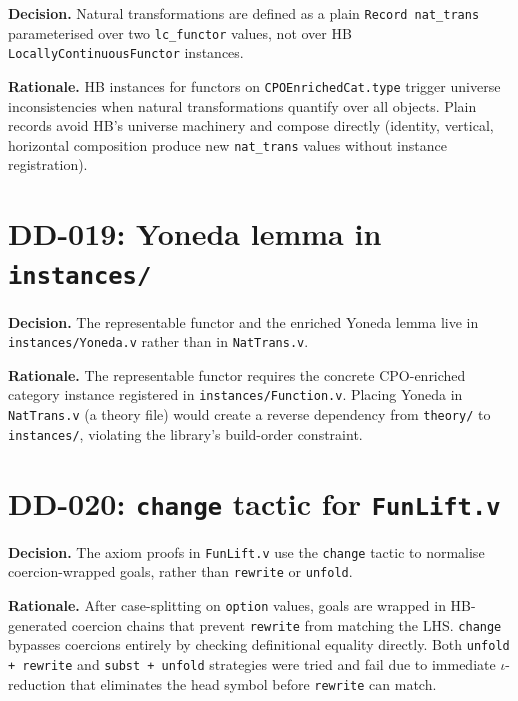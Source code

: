 \textbf{Decision.}
Natural transformations are defined as a plain \texttt{Record nat\_trans}
parameterised over two \texttt{lc\_functor} values, not over HB
\texttt{LocallyContinuousFunctor} instances.

\textbf{Rationale.}
HB instances for functors on \texttt{CPOEnrichedCat.type} trigger
universe inconsistencies when natural transformations quantify over all
objects.  Plain records avoid HB's universe machinery and compose
directly (identity, vertical, horizontal composition produce new
\texttt{nat\_trans} values without instance registration).

\section*{DD-019: Yoneda lemma in \texttt{instances/}}

\textbf{Decision.}
The representable functor and the enriched Yoneda lemma live in
\texttt{instances/Yoneda.v} rather than in \texttt{NatTrans.v}.

\textbf{Rationale.}
The representable functor requires the concrete CPO-enriched category
instance registered in \texttt{instances/Function.v}.  Placing Yoneda in
\texttt{NatTrans.v} (a theory file) would create a reverse dependency
from \texttt{theory/} to \texttt{instances/}, violating the library's
build-order constraint.

\section*{DD-020: \texttt{change} tactic for \texttt{FunLift.v}}

\textbf{Decision.}
The axiom proofs in \texttt{FunLift.v} use the \texttt{change} tactic
to normalise coercion-wrapped goals, rather than \texttt{rewrite} or
\texttt{unfold}.

\textbf{Rationale.}
After case-splitting on \texttt{option} values, goals are wrapped in
HB-generated coercion chains that prevent \texttt{rewrite} from matching
the LHS.  \texttt{change} bypasses coercions entirely by checking
definitional equality directly.  Both \texttt{unfold + rewrite} and
\texttt{subst + unfold} strategies were tried and fail due to immediate
$\iota$-reduction that eliminates the head symbol before
\texttt{rewrite} can match.

